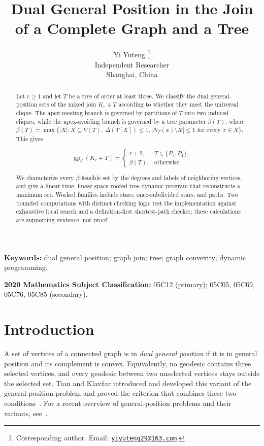 \documentclass[11pt,a4paper]{article}
\title{Dual General Position in the Join of a Complete Graph and a Tree}
\author{%
  Yi Yuteng%
  \thanks{Corresponding author. Email:
  \href{mailto:yiyuteng29@163.com}{\texttt{yiyuteng29@163.com}}.}\\
  \small Independent Researcher\\
  \small Shanghai, China}
\date{}
\numberwithin{equation}{section}
\begin{document}
\maketitle
\linenumbers

\begin{abstract}

Let \(r\ge 1\) and let \(T\) be a tree of order at least three. We
classify the dual general-position sets of the mixed join \(K_r+T\)
according to whether they meet the universal clique. The apex-meeting
branch is governed by partitions of \(T\) into two induced cliques,
while the apex-avoiding branch is governed by a tree parameter
\(\beta(T)\), where
\(\beta(T)=\max\{|X|:X\subseteq V(T),\ \Delta(T[X])\le 1,
|N_T(x)\setminus X|\le 1\text{ for every }x\in X\}\). This gives

\[
\operatorname{gp}_d(K_r+T)=
\begin{cases}
r+2,&T\in\{P_3,P_4\},\\
\beta(T),&\text{otherwise}.
\end{cases}
\]

We characterize every \(\beta\)-feasible set by the degrees and labels
of neighboring vertices, and give a linear-time, linear-space
rooted-tree dynamic program that reconstructs a maximum set. Worked
families include stars, once-subdivided stars, and paths. Two bounded
computations with distinct checking logic test the implementation against
exhaustive local search and a definition-first shortest-path checker; these
calculations are supporting evidence, not proof.
\end{abstract}

\noindent\textbf{Keywords:} dual general position; graph join; tree;
graph convexity; dynamic programming.

\medskip
\noindent\textbf{2020 Mathematics Subject Classification:}
05C12 (primary); 05C05, 05C69, 05C76, 05C85 (secondary).

\section{Introduction}\label{sec:introduction}

A set of vertices of a connected graph is in \emph{dual general
position} if it is in general position and its complement is convex.
Equivalently, no geodesic contains three selected vertices, and every
geodesic between two unselected vertices stays outside the selected set.
Tian and Klav\v{z}ar introduced and developed this variant of the
general-position problem and proved the criterion that combines these
two conditions~\cite{tian-klavzar-variety}. For a recent overview of
general-position problems and their variants, see~\cite{chandran-et-al-survey}.
\end{document}

